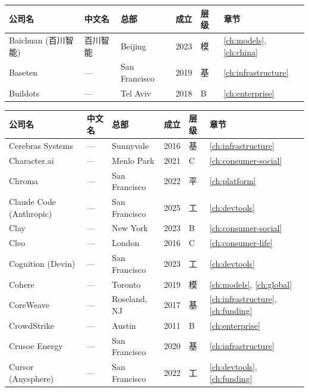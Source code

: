 \bigskip

\nopagebreak
\begin{tabularx}{\textwidth}{@{}l X l l l l@{}}
\toprule
\rowcolor{figLightGray}
\textbf{公司名} & \textbf{中文名} & \textbf{总部} & \textbf{成立} & \textbf{层级} & \textbf{章节} \\
\midrule
Baichuan (百川智能) & 百川智能       & Beijing       & 2023 & 模   & \ref{ch:models}, \ref{ch:china} \\
Baseten             & ---            & San Francisco & 2019 & 基   & \ref{ch:infrastructure} \\
Buildots            & ---            & Tel Aviv      & 2018 & B    & \ref{ch:enterprise} \\
\bottomrule
\end{tabularx}

\bigskip

\nopagebreak
\begin{tabularx}{\textwidth}{@{}l X l l l l@{}}
\toprule
\rowcolor{figLightGray}
\textbf{公司名} & \textbf{中文名} & \textbf{总部} & \textbf{成立} & \textbf{层级} & \textbf{章节} \\
\midrule
Cerebras Systems    & ---             & Sunnyvale     & 2016 & 基   & \ref{ch:infrastructure} \\
Character.ai        & ---             & Menlo Park    & 2021 & C    & \ref{ch:consumer-social} \\
Chroma              & ---             & San Francisco & 2022 & 平   & \ref{ch:platform} \\
Claude Code (Anthropic) & ---         & San Francisco & 2025 & 工   & \ref{ch:devtools} \\
Clay                & ---             & New York      & 2023 & B    & \ref{ch:consumer-social} \\
Cleo                & ---             & London        & 2016 & C    & \ref{ch:consumer-life} \\
Cognition (Devin)   & ---             & San Francisco & 2023 & 工   & \ref{ch:devtools} \\
Cohere              & ---             & Toronto       & 2019 & 模   & \ref{ch:models}, \ref{ch:global} \\
CoreWeave           & ---             & Roseland, NJ  & 2017 & 基   & \ref{ch:infrastructure}, \ref{ch:funding} \\
CrowdStrike         & ---             & Austin        & 2011 & B    & \ref{ch:enterprise} \\
Crusoe Energy       & ---             & San Francisco & 2020 & 基   & \ref{ch:infrastructure} \\
Cursor (Anysphere)  & ---             & San Francisco & 2022 & 工   & \ref{ch:devtools}, \ref{ch:funding} \\
\bottomrule
\end{tabularx}

